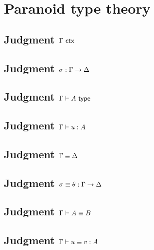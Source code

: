 \documentclass{article}
\begin{document}
\showEttEqtermRules


\section*{Paranoid type theory}
\label{sec:paranoid-type-theory}

\subsection*{Judgment $\Gamma\ \mathsf{ctx}$}

\showPttIsctxRules

\subsection*{Judgment $\sigma : \Gamma \to \Delta$}

\showPttIssubstRules

\subsection*{Judgment $\Gamma \vdash A \ \mathsf{type}$}

\showPttIstypeRules

\subsection*{Judgment $\Gamma \vdash u : A$}

\showPttIstermRules

\subsection*{Judgment $\Gamma \equiv \Delta$}

\showPttEqctxRules

\subsection*{Judgment $\sigma \equiv \theta : \Gamma \to \Delta$}

\showPttEqsubstRules

\subsection*{Judgment $\Gamma \vdash A \equiv B$}

\showPttEqtypeRules

\subsection*{Judgment $\Gamma \vdash u \equiv v : A$}

\showPttEqtermRules
\end{document}
